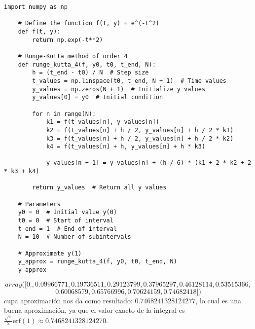 \documentclass[12pt,letterpaper,oneside]{article}
\begin{document}
\begin{lstlisting}[basicstyle=\small\ttfamily, breaklines=true]
    import numpy as np
    
    # Define the function f(t, y) = e^(-t^2)
    def f(t, y):
        return np.exp(-t**2)
    
    # Runge-Kutta method of order 4
    def runge_kutta_4(f, y0, t0, t_end, N):
        h = (t_end - t0) / N  # Step size
        t_values = np.linspace(t0, t_end, N + 1)  # Time values
        y_values = np.zeros(N + 1)  # Initialize y values
        y_values[0] = y0  # Initial condition
    
        for n in range(N):
            k1 = f(t_values[n], y_values[n])
            k2 = f(t_values[n] + h / 2, y_values[n] + h / 2 * k1)
            k3 = f(t_values[n] + h / 2, y_values[n] + h / 2 * k2)
            k4 = f(t_values[n] + h, y_values[n] + h * k3)
    
            y_values[n + 1] = y_values[n] + (h / 6) * (k1 + 2 * k2 + 2 * k3 + k4)
    
        return y_values  # Return all y values
    
    # Parameters
    y0 = 0  # Initial value y(0)
    t0 = 0  # Start of interval
    t_end = 1  # End of interval
    N = 10  # Number of subintervals
    
    # Approximate y(1)
    y_approx = runge_kutta_4(f, y0, t0, t_end, N)
    y_approx
    \end{lstlisting}
    

\[array([0.        , 0.09966771, 0.19736511, 0.29123799, 0.37965297,
0.46128114, 0.53515366,\] \[0.60068579, 0.65766996, 0.70624159,
0.74682418])\]
cupa aproximación nos da como resultado: 0.7468241328124277, lo cual es una buena aproximación, ya que el valor exacto de la integral es $\frac{\sqrt{\pi}}{2}\text{erf}(1)\approx0.7468241328124270$.
\end{document}
